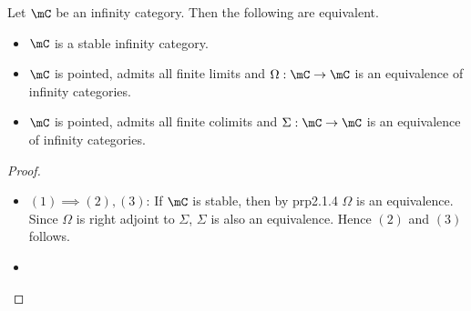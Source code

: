 \documentclass[a4paper]{article}
\begin{document}
\begin{prp}{}{} Let $\mC$ be an infinity category. Then the following are equivalent. 
\begin{itemize}
\item $\mC$ is a stable infinity category. 
\item $\mC$ is pointed, admits all finite limits and $\Omega:\mC\to\mC$ is an equivalence of infinity categories. 
\item $\mC$ is pointed, admits all finite colimits and $\Sigma:\mC\to\mC$ is an equivalence of infinity categories. 
\end{itemize} 
\begin{proof}~\\
\begin{itemize}
\item $(1)\implies(2),(3)$: If $\mC$ is stable, then by prp2.1.4 $\Omega$ is an equivalence. Since $\Omega$ is right adjoint to $\Sigma$, $\Sigma$ is also an equivalence. Hence $(2)$ and $(3)$ follows. \\

\item 
\end{itemize}
\end{proof}
\end{prp}
\end{document}
